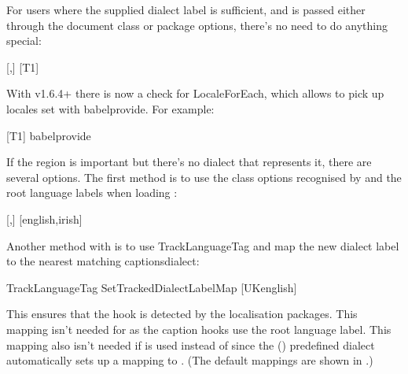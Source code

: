 \documentclass[titlepage=false,oneside,
 fontsize=12pt,captions=tableheading]{scrbook}
\newcommand{\tklcaptions}[1]{\glslink{captionsdialect}{\csfmt{captions#1}}}
\begin{document}
For  users where the supplied  dialect
label is sufficient, and is passed either through the document class
or package options, there's no need to do anything special:
\begin{codebox*}
[,]
[T1]
\end{codebox*}
With  v1.6.4+ there is now a check for
\gls{LocaleForEach}, which allows  to pick up locales
set with \gls{babelprovide}. For example:
\begin{codebox*}
[T1]
\gls{babelprovide}
\end{codebox*}

If the region is important but there's no  dialect that
represents it, there are several options.
The first method is to use the class options recognised by 
and the root language labels when loading :
\begin{codebox*}
[,]
[english,irish]
\end{codebox*}

Another method with  is to use \gls{TrackLanguageTag} and map the new
dialect label to the nearest matching \gls{captionsdialect}:
\begin{codebox*}
\codepar
{}
\gls{TrackLanguageTag}
\gls{SetTrackedDialectLabelMap}
\codepar
{}[UKenglish]
\end{codebox*}
This ensures that the \tklcaptions{UKenglish} hook is detected
by the localisation packages. This mapping isn't needed
for  as the caption hooks use the root language
label. This mapping also isn't needed if  is used
instead of  since the 
()
predefined dialect automatically sets up a mapping to
. (The default mappings are shown in
.)
\end{document}
